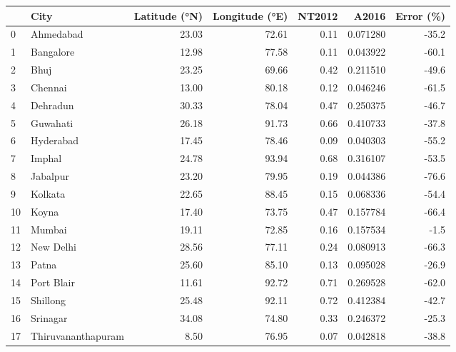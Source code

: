 \begin{tabular}{llrrrrr}
\toprule
{} &                City &  Latitude (°N) &  Longitude (°E) &  NT2012 &     A2016 &  Error (\%) \\
\midrule
0  &           Ahmedabad &          23.03 &           72.61 &    0.11 &  0.071280 &      -35.2 \\
1  &           Bangalore &          12.98 &           77.58 &    0.11 &  0.043922 &      -60.1 \\
2  &                Bhuj &          23.25 &           69.66 &    0.42 &  0.211510 &      -49.6 \\
3  &             Chennai &          13.00 &           80.18 &    0.12 &  0.046246 &      -61.5 \\
4  &            Dehradun &          30.33 &           78.04 &    0.47 &  0.250375 &      -46.7 \\
5  &            Guwahati &          26.18 &           91.73 &    0.66 &  0.410733 &      -37.8 \\
6  &           Hyderabad &          17.45 &           78.46 &    0.09 &  0.040303 &      -55.2 \\
7  &              Imphal &          24.78 &           93.94 &    0.68 &  0.316107 &      -53.5 \\
8  &            Jabalpur &          23.20 &           79.95 &    0.19 &  0.044386 &      -76.6 \\
9  &             Kolkata &          22.65 &           88.45 &    0.15 &  0.068336 &      -54.4 \\
10 &               Koyna &          17.40 &           73.75 &    0.47 &  0.157784 &      -66.4 \\
11 &              Mumbai &          19.11 &           72.85 &    0.16 &  0.157534 &       -1.5 \\
12 &           New Delhi &          28.56 &           77.11 &    0.24 &  0.080913 &      -66.3 \\
13 &               Patna &          25.60 &           85.10 &    0.13 &  0.095028 &      -26.9 \\
14 &          Port Blair &          11.61 &           92.72 &    0.71 &  0.269528 &      -62.0 \\
15 &            Shillong &          25.48 &           92.11 &    0.72 &  0.412384 &      -42.7 \\
16 &            Srinagar &          34.08 &           74.80 &    0.33 &  0.246372 &      -25.3 \\
17 &  Thiruvananthapuram &           8.50 &           76.95 &    0.07 &  0.042818 &      -38.8 \\
\bottomrule
\end{tabular}
